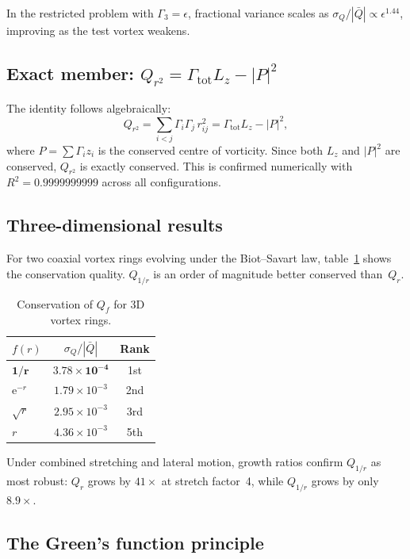 \documentclass[rapids]{jfm}
\begin{document}
In the restricted problem with $\Gamma_3 = \epsilon$, fractional variance scales as $\sigma_Q/|\bar{Q}| \propto \epsilon^{1.44}$, improving as the test vortex weakens.

\subsection{Exact member: $Q_{r^2} = \Gamma_\mathrm{tot} L_z - |P|^2$}

The identity follows algebraically:
\begin{equation}
Q_{r^2} = \sum_{i<j} \Gamma_i \Gamma_j\, r_{ij}^2 = \Gamma_\mathrm{tot} L_z - |P|^2,
\end{equation}
where $P = \sum \Gamma_i z_i$ is the conserved centre of vorticity. Since both $L_z$ and $|P|^2$ are conserved, $Q_{r^2}$ is exactly conserved. This is confirmed numerically with $R^2 = 0.9999999999$ across all configurations.

\subsection{Three-dimensional results}

For two coaxial vortex rings evolving under the Biot--Savart law, table~\ref{tab:3d} shows the conservation quality. $Q_{1/r}$ is an order of magnitude better conserved than~$Q_r$.

\begin{table}
\centering
\caption{Conservation of $Q_f$ for 3D vortex rings.}
\label{tab:3d}
\begin{tabular}{@{}lcc@{}}
\toprule
$f(r)$ & $\sigma_Q/|\bar{Q}|$ & Rank \\
\midrule
$\mathbf{1/r}$   & $\mathbf{3.78 \times 10^{-4}}$ & 1st \\
$\mathrm{e}^{-r}$ & $1.79 \times 10^{-3}$ & 2nd \\
$\sqrt{r}$        & $2.95 \times 10^{-3}$ & 3rd \\
$r$               & $4.36 \times 10^{-3}$ & 5th \\
\bottomrule
\end{tabular}
\end{table}

Under combined stretching and lateral motion, growth ratios confirm $Q_{1/r}$ as most robust: $Q_r$ grows by $41\times$ at stretch factor~4, while $Q_{1/r}$ grows by only $8.9\times$.

\subsection{The Green's function principle}
\end{document}
